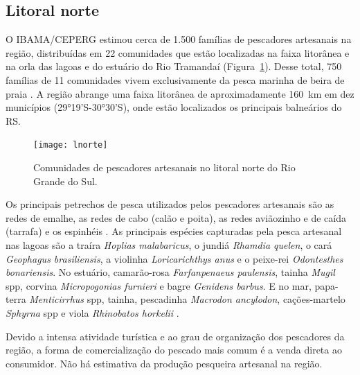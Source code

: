 \documentclass[a4paper,11pt,twoside,showtrims,onecolumn,openright,final]{memoir}
\begin{document}

\subsection*{Litoral norte}

O IBAMA/CEPERG estimou cerca de 1.500 famílias de pescadores artesanais na região, 
distribuídas em 22 comunidades que estão localizadas na faixa litorânea e na orla das 
lagoas e do estuário do Rio Tramandaí (Figura~\ref{fig:lnorte}). Desse total, 750 famílias de 11 
comunidades vivem exclusivamente da pesca marinha de beira de praia \citep{peres2005a}. A região
abrange uma faixa litorânea de aproximadamente 160~km em dez municípios (29°19'S-30°30'S), onde
estão localizados os principais balneários do RS.


\begin{figure}
\begin{center}
\texttt{[image: lnorte]}
\end{center}
\caption{Comunidades de pescadores artesanais no litoral norte do Rio Grande do Sul.}
\label{fig:lnorte}
\end{figure}


Os principais petrechos de pesca utilizados pelos pescadores artesanais são as 
redes de emalhe, as redes de cabo (calão e poita), as redes aviãozinho e de caída (tarrafa) e os espinhéis \citep{bertoletti1983,silva1982,peres2005b,peres2005a}. As principais espécies capturadas pela pesca 
artesanal nas lagoas são a traíra \emph{Hoplias malabaricus}, o jundiá \emph{Rhamdia quelen}, 
o cará \emph{Geophagus brasiliensis}, a violinha \emph{Loricarichthys anus} e o peixe-rei \emph{Odontesthes bonariensis}. No estuário, camarão-rosa \emph{Farfanpenaeus paulensis}, tainha \emph{Mugil} spp, 
corvina \emph{Micropogonias furnieri} e bagre \emph{Genidens barbus}. E no mar, 
papa-terra \emph{Menticirrhus} spp, tainha, 
pescadinha \emph{Macrodon ancylodon}, cações-martelo \emph{Sphyrna} spp 
e viola \emph{Rhinobatos horkelii} \citep{peres2005b,peres2005a}.

Devido a intensa atividade turística e ao grau de 
organização dos pescadores da região, a forma de comercialização do pescado mais comum
é a venda direta ao consumidor. Não há estimativa da produção pesqueira artesanal na 
região.
\end{document}

